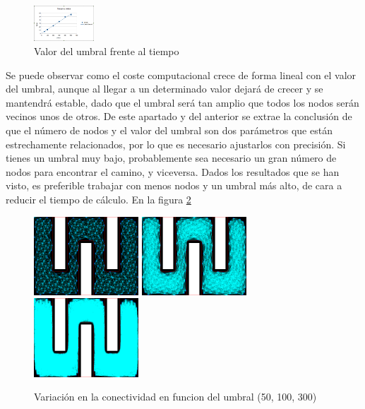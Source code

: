 \begin{figure}[H]
		\centering
        \includegraphics[width=0.2\textwidth]{images/t_vs_umbral.png}
        \caption{Valor del umbral frente al tiempo}
        \label{fig:umbral_vs_t}
\end{figure}

Se puede observar como el coste computacional crece de forma lineal con el valor del umbral, aunque al llegar a un determinado valor dejará de crecer y se mantendrá estable, dado que el umbral será tan amplio que todos los nodos serán vecinos unos de otros. De este apartado y del anterior se extrae la conclusión de que el número de nodos y el valor del umbral son dos parámetros que están estrechamente relacionados, por lo que es necesario ajustarlos con precisión. Si tienes un umbral muy bajo, probablemente sea necesario un gran número de nodos para encontrar el camino, y viceversa. Dados los resultados que se han visto, es preferible trabajar con menos nodos y un umbral más alto, de cara a reducir el tiempo de cálculo. En la figura \ref{fig:50_100_300umbral}

\begin{figure}[h]
		\centering
        \includegraphics[width=0.35\textwidth]{images/50-500points.png}
        \includegraphics[width=0.35\textwidth]{images/100-500points.png}
        \includegraphics[width=0.35\textwidth]{images/300-500points.png}
        \caption{Variación en la conectividad en funcion del umbral (50, 100, 300)}
        \label{fig:50_100_300umbral}
\end{figure}

